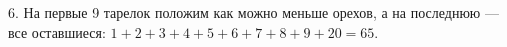 6. На первые 9 тарелок положим как можно меньше орехов, а на последнюю --- все оставшиеся: $1+2+3+4+5+6+7+8+9+20=65.$\\
